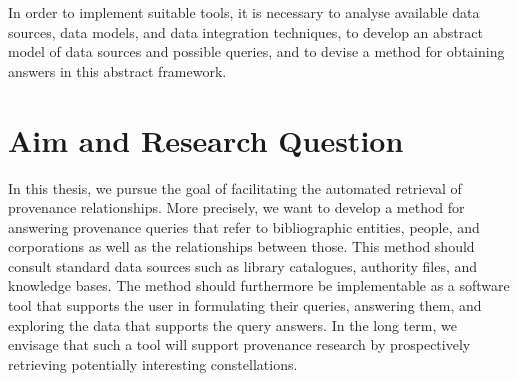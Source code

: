 In order to implement suitable tools,
it is necessary to analyse available data sources, data models, and data integration techniques,
to develop an abstract model of data sources and possible queries,
and to devise a method for obtaining answers in this abstract framework.


\section{Aim and Research Question}
\label{sec:research_questions}

In this thesis, we pursue the goal of facilitating
the automated retrieval of provenance relationships.
More precisely,
we want to develop a method for answering provenance queries that refer to bibliographic entities, people, and corporations
as well as the relationships between those. This method should consult standard data sources such as 
library catalogues, authority files, and knowledge bases. The method should furthermore be implementable as a software tool
that supports the user in formulating their queries, answering them, and exploring the data that supports the query answers.
In the long term, we envisage that such a tool will support provenance research
by prospectively retrieving potentially interesting constellations.

